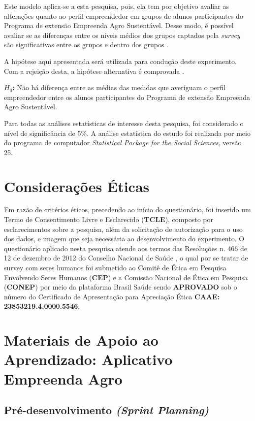 Este modelo aplica-se a esta pesquisa, pois, ela tem por objetivo avaliar as alterações quanto ao perfil empreendedor em grupos de alunos participantes do Programa de extensão Empreenda Agro Sustentável. Desse modo, é possível avaliar se as diferenças entre os níveis médios dos grupos captados pela \textit{survey} são significativas entre os grupos e dentro dos grupos \cite{rocha_avaliacao_2014}.

A hipótese aqui apresentada será utilizada para condução deste experimento. Com a rejeição desta, a hipótese alternativa é comprovada \cite{hair_alise_2009}.

\textbf{$H_0$:} Não há diferença entre as médias das medidas que averíguam o perfil empreendedor entre os alunos participantes do Programa de extensão Empreenda Agro Sustentável.

Para todas as análises estatísticas de interesse desta pesquisa, foi considerado o nível de significância de 5\%. A análise estatística do estudo foi realizada por meio do programa de computador \textit{Statistical Package for the Social Sciences}, \cite{ibm_corp_ibm_2017} versão 25. 

\section{Considerações Éticas}

Em razão de critérios éticos, precedendo ao início do questionário, foi inserido um Termo de Consentimento Livre e Esclarecido (\textbf{TCLE}), composto por esclarecimentos sobre a pesquisa, além da solicitação de autorização para o uso dos dados, e imagem que seja necessária ao desenvolvimento do experimento. O questionário aplicado nesta pesquisa atende aos termos das Resoluções n. 466 de 12 de dezembro de 2012 do Conselho Nacional de Saúde \cite{cns_resolucao_2012}, o qual por se tratar de survey com seres humanos foi submetido ao Comitê de Ética em Pesquisa Envolvendo Seres Humanos (\textbf{CEP}) e a Comissão Nacional de Ética em Pesquisa (\textbf{CONEP}) por meio da plataforma Brasil Saúde sendo \textbf{APROVADO} sob o número do Certificado de Apresentação para Apreciação Ética \textbf{CAAE: 23853219.4.0000.5546}.

\section{Materiais de Apoio ao Aprendizado: Aplicativo Empreenda Agro}

\subsection{Pré-desenvolvimento \textit{(Sprint Planning)}}

